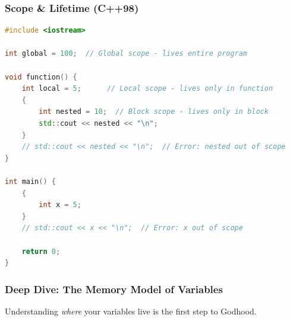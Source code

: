 \hypertarget{scope-lifetime-c98}{%
\subsubsection{Scope \& Lifetime (C++98)}\label{scope-lifetime-c98}}

\begin{lstlisting}[language={C++}]
#include <iostream>

int global = 100;  // Global scope - lives entire program

void function() {
    int local = 5;      // Local scope - lives only in function
    {
        int nested = 10;  // Block scope - lives only in block
        std::cout << nested << "\n";
    }
    // std::cout << nested << "\n";  // Error: nested out of scope
}

int main() {
    {
        int x = 5;
    }
    // std::cout << x << "\n";  // Error: x out of scope

    return 0;
}
\end{lstlisting}

\hypertarget{deep-dive-the-memory-model-of-variables}{%
\subsubsection{Deep Dive: The Memory Model of
Variables}\label{deep-dive-the-memory-model-of-variables}}

Understanding \emph{where} your variables live is the first step to
Godhood.

